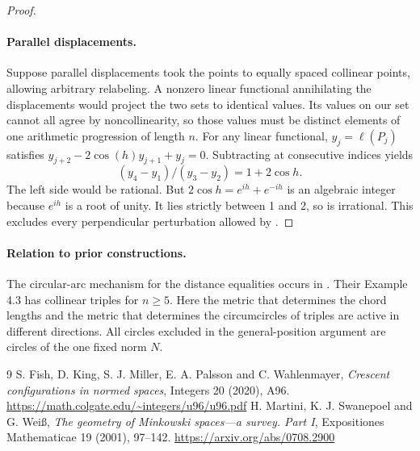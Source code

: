 \documentclass[11pt]{article}
\begin{document}
\begin{proof}
\paragraph{Parallel displacements.} Suppose parallel displacements took the
points to equally spaced collinear points, allowing arbitrary relabeling.
A nonzero linear functional annihilating the displacements would project
the two sets to identical values. Its values on our set cannot all agree
by noncollinearity, so those values must be distinct elements of one
arithmetic progression of length $n$. For any linear functional,
$y_j=\ell(P_j)$ satisfies $y_{j+2}-2\cos(h)y_{j+1}+y_j=0$.
Subtracting at consecutive indices yields
\[
 (y_4-y_1)/(y_3-y_2)=1+2\cos h.
\]
The left side would be rational. But $2\cos h=e^{ih}+e^{-ih}$ is an
algebraic integer because $e^{ih}$ is a root of unity. It lies strictly
between 1 and 2, so is irrational. This excludes every perpendicular
perturbation allowed by \cite[Definition 4.1]{fish}.
\end{proof}
\paragraph{Relation to prior constructions.}
The circular-arc mechanism for the distance equalities occurs in
\cite[Theorem 1.3]{fish}. Their Example 4.3 has collinear triples for
$n\ge5$. Here the metric that determines the chord lengths and the
metric that determines the circumcircles of triples are active in different
directions. All circles excluded in the general-position argument are
circles of the one fixed norm $N$.
\begin{thebibliography}{9}
 S. Fish, D. King, S. J. Miller, E. A. Palsson and C. Wahlenmayer,
\emph{Crescent configurations in normed spaces}, Integers 20 (2020), A96.
\url{https://math.colgate.edu/~integers/u96/u96.pdf}
 H. Martini, K. J. Swanepoel and G. Wei\ss,
\emph{The geometry of Minkowski spaces---a survey. Part I},
Expositiones Mathematicae 19 (2001), 97--142.
\url{https://arxiv.org/abs/0708.2900}
\end{thebibliography}
\end{document}
